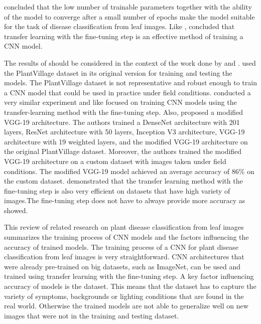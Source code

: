 \documentclass{BachelorBUI}
\begin{document}
        \cite{Too:2019} concluded that the low number of trainable parameters together with the ability of the model to converge after a small number of epochs make the model suitable for the task of disease classification from leaf images. Like \textcite{Mohanty:2016}, \textcite{Too:2019} concluded that transfer learning with the fine-tuning step is an effective method of training a CNN model. 

        The results of \textcite{Too:2019} should be considered in the context of the work done by \textcite{Barbedo:2018:1} and \textcite{Barbedo:2018:2}. \textcite{Too:2019} used the PlantVillage dataset in its original version for training and testing the models. The PlantVillage dataset is not representative and robust enough to train a CNN model that could be used in practice under field conditions. \textcite{Chen:2020} conducted a very similar experiment and like \textcite{Too:2019} focused on training CNN models using the transfer-learning method with the fine-tuning step. Also, \textcite{Chen:2020} proposed a modified VGG-19 architecture. The authors trained a DenseNet architecture with 201 layers, ResNet architecture with 50 layers, Inception V3 architecture, VGG-19 architecture with 19 weighted layers, and the modified VGG-19 architecture on the original PlantVillage dataset. Moreover, the authors trained the modified VGG-19 architecture on a custom dataset with images taken under field conditions. The modified VGG-19 model achieved an average accuracy of 86\% on the custom dataset.  \textcite{Chen:2020} demonstrated that the transfer learning method with the fine-tuning step is also very efficient on datasets that have high variety of images.The fine-tuning step does not have to always provide more accuracy as \textcite{Sladojevic:2016} showed.

        This review of related research on plant disease classification from leaf images summarizes the training process of CNN models and the factors influencing the accuracy of trained models. The training process of a CNN for plant disease classification from leaf images is very straightforward. CNN architectures that were already pre-trained on big datasets, such as ImageNet, can be used and trained using transfer learning with the fine-tuning step. A key factor influencing accuracy of models is the dataset. This means that the dataset has to capture the variety of symptoms, backgrounds or lighting conditions that are found in the real world. Otherwise the trained models are not able to generalize well on new images that were not in the training and testing dataset. 
\end{document}
